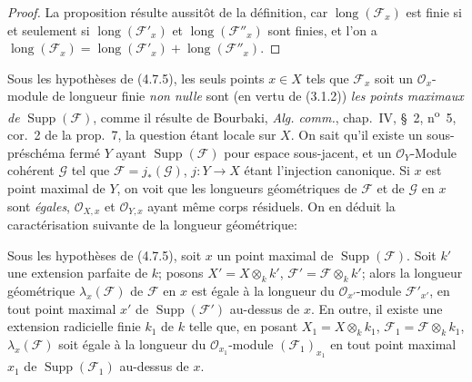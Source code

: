 \begin{proof}
La proposition résulte aussitôt de la définition, car
$\operatorname{long}(\mathscr F_x)$ est finie si et seulement si
$\operatorname{long}(\mathscr F'_x)$ et
$\operatorname{long}(\mathscr F''_x)$ sont finies, et l'on a
$\operatorname{long}(\mathscr F_x)
=\operatorname{long}(\mathscr F'_x)+\operatorname{long}(\mathscr F''_x)$.
\end{proof}

\begin{env}[4.7.7]
\label{IV.2.4.7.7-fr}
Sous les hypothèses de (4.7.5), les seuls points $x\in X$ tels que
$\mathscr F_x$ soit un $\mathcal O_x$-module de longueur finie \emph{non nulle} sont
(en vertu de (3.1.2)) \emph{les points maximaux de}
$\operatorname{Supp}(\mathscr F)$, comme il résulte de Bourbaki,
\emph{Alg. comm.}, chap.~IV, \S~2, n\textsuperscript{o}~5, cor.~2 de la
prop.~7, la question étant locale sur $X$. On sait qu'il existe un
sous-préschéma fermé $Y$ ayant $\operatorname{Supp}(\mathscr F)$ pour espace
sous-jacent, et un $\mathcal O_Y$-Module cohérent $\mathscr G$ tel que
$\mathscr F=j_*(\mathscr G)$, $j:Y\to X$ étant l'injection canonique. Si $x$
est point maximal de $Y$, on voit que les longueurs géométriques de
$\mathscr F$ et de $\mathscr G$ en $x$ sont \emph{égales}, $\mathcal O_{X,x}$ et
$\mathcal O_{Y,x}$ ayant même corps résiduels. On en déduit la caractérisation
suivante de la longueur géométrique:
\end{env}

\begin{proposition}[4.7.8]
\label{IV.2.4.7.8-fr}
Sous les hypothèses de \textup{(4.7.5)}, soit $x$ un point maximal de
$\operatorname{Supp}(\mathscr F)$. Soit $k'$ une extension parfaite de $k$;
posons $X'=X\otimes_k k'$, $\mathscr F'=\mathscr F\otimes_k k'$; alors la
longueur géométrique $\lambda_x(\mathscr F)$ de $\mathscr F$ en $x$ est égale
à la longueur du $\mathcal O_{x'}$-module $\mathscr F'_{x'}$, en tout point
maximal $x'$ de $\operatorname{Supp}(\mathscr F')$ au-dessus de $x$. En outre,
il existe une extension radicielle finie $k_1$ de $k$ telle que, en posant
$X_1=X\otimes_k k_1$, $\mathscr F_1=\mathscr F\otimes_k k_1$,
$\lambda_x(\mathscr F)$ soit égale à la longueur du
$\mathcal O_{x_1}$-module $(\mathscr F_1)_{x_1}$ en tout point maximal $x_1$
de $\operatorname{Supp}(\mathscr F_1)$ au-dessus de $x$.
\end{proposition}

